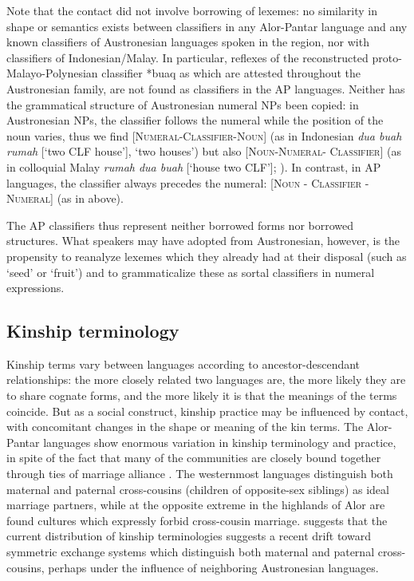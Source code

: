Note that the contact did not involve borrowing of lexemes: no similarity in shape or semantics exists between classifiers in any Alor-Pantar language and any known classifiers of Austronesian languages spoken in the region, nor with classifiers of Indonesian/Malay. In particular, reflexes of the reconstructed proto-Malayo-Polynesian classifier *buaq as which are attested throughout the Austronesian family, are not found as classifiers in the AP languages. Neither has the grammatical structure of Austronesian numeral NPs been copied: in Austronesian NPs, the classifier follows the numeral while the position of the noun varies, thus we find [\textsc{Numeral-Classifier-Noun}] (as in Indonesian \textit{dua buah rumah} [`two CLF house'], `two houses') but also \textsc{[Noun-Numeral- Classifier]} (as in colloquial Malay \textit{rumah dua buah} [`house two CLF']; \citealt[283-284]{Blust2009}). In contrast, in AP languages, the classifier always precedes the numeral: \textsc{[Noun - Classifier - Numeral]} (as in  above).

The AP classifiers thus represent neither borrowed forms nor borrowed structures. What speakers may have adopted from Austronesian, however, is the propensity to reanalyze lexemes which they already had at their disposal (such as `seed' or `fruit') and to grammaticalize these as sortal classifiers in numeral expressions. 

\subsection{Kinship terminology}\label{sec:1:6.4}
Kinship terms vary between languages according to ancestor-descendant relationships: the more closely related two languages are, the more likely they are to share cognate forms, and the more likely it is that the meanings of the terms coincide. But as a social construct, kinship practice may be influenced by contact, with concomitant changes in the shape or meaning of the kin terms. The Alor-Pantar languages show enormous variation in kinship terminology and practice, in spite of the fact that many of the communities are closely bound together through ties of marriage alliance \citep{HoltonTVkinship}. The westernmost languages distinguish both maternal and paternal cross-cousins (children of opposite-sex siblings) as ideal marriage partners, while at the opposite extreme in the highlands of Alor are found cultures which expressly forbid cross-cousin marriage.  \citet{HoltonTVkinship} suggests that the current distribution of kinship terminologies suggests a recent drift toward symmetric exchange systems which distinguish both maternal and paternal cross-cousins, perhaps under the influence of neighboring Austronesian languages. 

